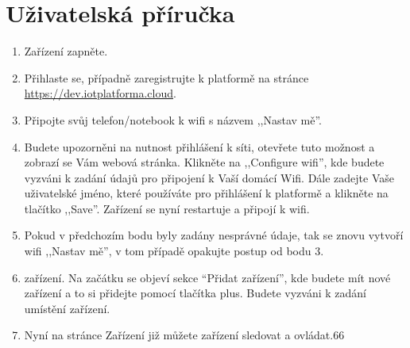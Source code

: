 \chapter{Uživatelská příručka}\label{user-guide}
\begin{enumerate}
    \item Zařízení zapněte.
    \item Přihlaste se, případně zaregistrujte k platformě na stránce \\
          \href{https://dev.iotplatforma.cloud}{https://dev.iotplatforma.cloud}.
    \item Připojte svůj telefon/notebook k wifi s názvem ,,Nastav mě”.
    \item Budete upozorněni na nutnost přihlášení k síti, otevřete tuto možnost a zobrazí se Vám webová stránka. Klikněte na ,,Configure wifi”, kde budete vyzváni k zadání údajů pro připojení k Vaší domácí Wifi. Dále zadejte Vaše uživatelské jméno, které používáte pro přihlášení k platformě a klikněte na tlačítko ,,Save”. Zařízení se nyní restartuje a připojí k wifi.
    \item Pokud v předchozím bodu byly zadány nesprávné údaje, tak se znovu vytvoří wifi ,,Nastav mě”, v tom případě opakujte postup od bodu 3.
    \item zařízení. Na začátku se objeví sekce “Přidat zařízení”, kde budete mít nové zařízení a to si přidejte pomocí tlačítka plus. Budete vyzváni k zadání umístění zařízení.
    \item Nyní na stránce Zařízení již můžete zařízení sledovat a ovládat.66
\end{enumerate}